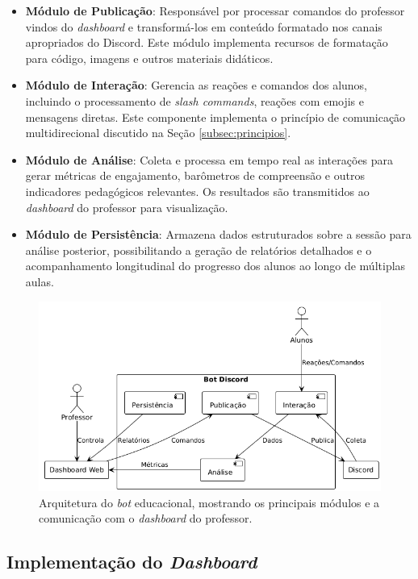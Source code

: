 \begin{itemize}
\item \textbf{Módulo de Publicação}: Responsável por processar comandos do
professor vindos do \textit{dashboard} e transformá-los em conteúdo formatado
nos canais apropriados do Discord. Este módulo implementa recursos de formatação
para código, imagens e outros materiais didáticos.
\item \textbf{Módulo de Interação}: Gerencia as reações e comandos dos alunos,
incluindo o processamento de \textit{slash commands}, reações com emojis e
mensagens diretas. Este componente implementa o princípio de comunicação
multidirecional discutido na Seção \ref{subsec:principios}.
\item \textbf{Módulo de Análise}: Coleta e processa em tempo real as interações
para gerar métricas de engajamento, barômetros de compreensão e outros
indicadores pedagógicos relevantes. Os resultados são transmitidos ao
\textit{dashboard} do professor para visualização.
\item \textbf{Módulo de Persistência}: Armazena dados estruturados sobre a
sessão para análise posterior, possibilitando a geração de relatórios detalhados
e o acompanhamento longitudinal do progresso dos alunos ao longo de múltiplas
aulas.
\end{itemize}

\begin{figure}[H] \centering
\centering
\includegraphics[width=16cm]{arquitetura-bot.png}
\caption{Arquitetura do \textit{bot} educacional, mostrando os principais
módulos e a comunicação com o \textit{dashboard} do professor.}
\label{fig:arquitetura-bot}
\end{figure}

\subsection{Implementação do \textit{Dashboard}}

